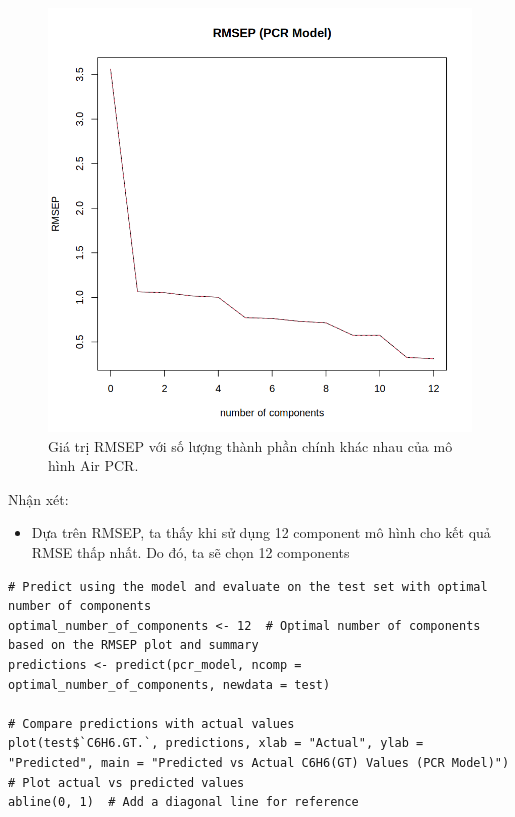 \begin{figure}[H]
    \centering
    \includegraphics[width=0.75\columnwidth]{air_figures/pcr_model.png}
    \caption{Giá trị RMSEP với số lượng thành phần chính khác nhau của mô hình Air PCR.}
    \label{fig:air_pcr_model}
\end{figure}
Nhận xét:
\begin{itemize}
    \item Dựa trên RMSEP, ta thấy khi sử dụng 12 component mô hình cho kết quả RMSE thấp nhất. Do đó, ta sẽ chọn 12 components
\end{itemize}

\begin{lstlisting}
# Predict using the model and evaluate on the test set with optimal number of components
optimal_number_of_components <- 12  # Optimal number of components based on the RMSEP plot and summary
predictions <- predict(pcr_model, ncomp = optimal_number_of_components, newdata = test)  

# Compare predictions with actual values
plot(test$`C6H6.GT.`, predictions, xlab = "Actual", ylab = "Predicted", main = "Predicted vs Actual C6H6(GT) Values (PCR Model)")  # Plot actual vs predicted values
abline(0, 1)  # Add a diagonal line for reference
\end{lstlisting}

